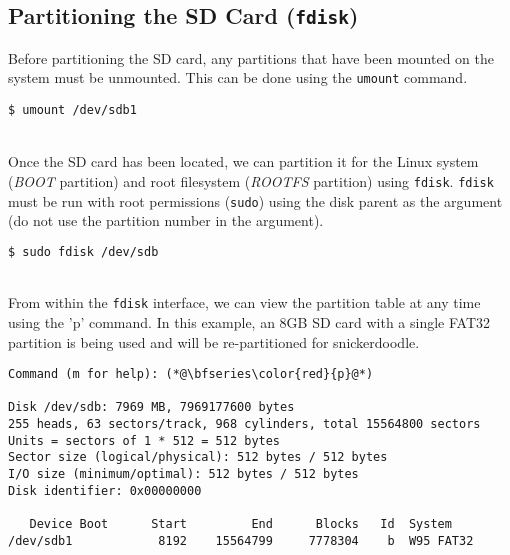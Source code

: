 \subsection{Partitioning the SD Card (\texttt{fdisk})}
Before partitioning the SD card, any partitions that have been mounted on the system must be unmounted. This can be done using the \texttt{umount} command. \\

\begin{lstlisting}
$ umount /dev/sdb1
\end{lstlisting}

~\\
\noindent
Once the SD card has been located, we can partition it for the Linux system (\textit{BOOT} partition) and root filesystem (\textit{ROOTFS} partition) using \texttt{fdisk}. \texttt{fdisk} must be run with root permissions (\texttt{sudo}) using the disk parent as the argument (do not use the partition number in the argument).\\ 


\begin{lstlisting}[language=bash]
$ sudo fdisk /dev/sdb
\end{lstlisting}

~\\
\noindent
From within the \texttt{fdisk} interface, we can view the partition table at any time using the 'p' command. In this example, an 8GB SD card with a single FAT32 partition is being used and will be re-partitioned for snickerdoodle. \\

\begin{lstlisting}[style=text]
Command (m for help): (*@\bfseries\color{red}{p}@*)

Disk /dev/sdb: 7969 MB, 7969177600 bytes
255 heads, 63 sectors/track, 968 cylinders, total 15564800 sectors
Units = sectors of 1 * 512 = 512 bytes
Sector size (logical/physical): 512 bytes / 512 bytes
I/O size (minimum/optimal): 512 bytes / 512 bytes
Disk identifier: 0x00000000

   Device Boot      Start         End      Blocks   Id  System
/dev/sdb1            8192    15564799     7778304    b  W95 FAT32
\end{lstlisting}

